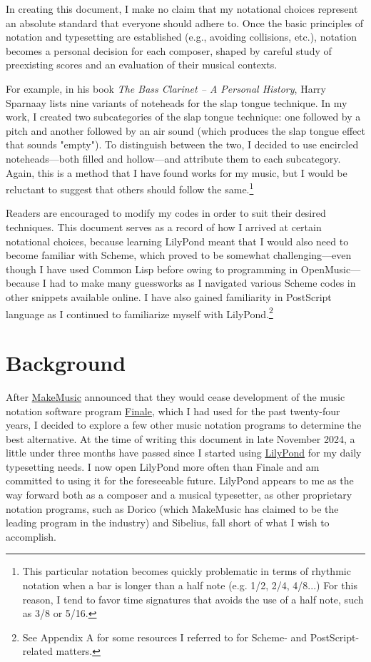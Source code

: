 In creating this document, I make no claim that my notational choices represent an absolute standard that everyone should adhere to. Once the basic principles of notation and typesetting are established (e.g., avoiding collisions, etc.), notation becomes a personal decision for each composer, shaped by careful study of preexisting scores and an evaluation of their musical contexts. 

For example, in his book \textit{The Bass Clarinet – A Personal History}, Harry Sparnaay lists nine variants of noteheads for the slap tongue technique.\autocite[66]{HS2012} In my work, I created two subcategories of the slap tongue technique: one followed by a pitch and another followed by an air sound (which produces the slap tongue effect that sounds "empty"). To distinguish between the two, I decided to use encircled noteheads—both filled and hollow—and attribute them to each subcategory. Again, this is a method that I have found works for my music, but I would be reluctant to suggest that others should follow the same.\footnote{This particular notation becomes quickly problematic in terms of rhythmic notation when a bar is longer than a half note (e.g. 1/2, 2/4, 4/8...) For this reason, I tend to favor time signatures that avoids the use of a half note, such as 3/8 or 5/16.} 

Readers are encouraged to modify my codes in order to suit their desired techniques. This document serves as a record of how I arrived at certain notational choices, because learning LilyPond meant that I would also need to become familiar with Scheme, which proved to be somewhat challenging—even though I have used Common Lisp before owing to programming in OpenMusic—because I had to make many guessworks as I navigated various Scheme codes in other snippets available online. I have also gained familiarity in PostScript language as I continued to familiarize myself with LilyPond.\footnote{See Appendix A for some resources I referred to for Scheme- and PostScript-related matters.}


\section{Background}

After \href{https://www.makemusic.com/}{MakeMusic} announced that they would cease development of the music notation software program \href{https://www.finalemusic.com/}{Finale}, which I had used for the past twenty-four years, I decided to explore a few other music notation programs to determine the best alternative. At the time of writing this document in late November 2024, a little under three months have passed since I started using \href{https://lilypond.org/}{LilyPond} for my daily typesetting needs. I now open LilyPond more often than Finale and am committed to using it for the foreseeable future. LilyPond appears to me as the way forward both as a composer and a musical typesetter, as other proprietary notation programs, such as Dorico (which MakeMusic has claimed to be the leading program in the industry) and Sibelius, fall short of what I wish to accomplish. 


